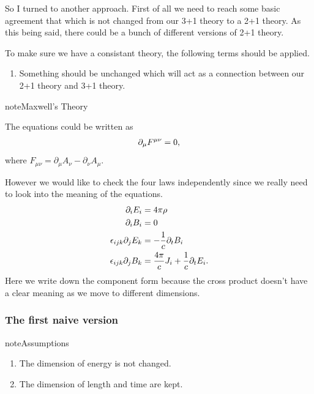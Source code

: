 \documentclass[letterpaper,10pt,english]{sphinxmanual}
\begin{document}
So I turned to another approach. First of all we need to reach some basic agreement that which is not changed from our 3+1 theory to a 2+1 theory. As this being said, there could be a bunch of different versions of 2+1 theory.

To make sure we have a consistant theory, the following terms should be applied.
\begin{enumerate}
\item {} 
Something should be unchanged which will act as a connection between our 2+1 theory and 3+1 theory.

\end{enumerate}

\begin{notice}{note}{Maxwell's Theory}

The equations could be written as
\begin{gather}
\begin{split}\partial_\mu F^{\mu\nu} = 0,\end{split}\notag
\end{gather}
where \(F_{\mu\nu} = \partial_\mu A_\nu -\partial_\nu A_\mu\).

However we would like to check the four laws independently since we really need to look into the meaning of the equations.
\begin{gather}
\begin{split}\partial_i E_i & = 4\pi \rho\\
\partial_i B_i & = 0 \\
\epsilon_{ijk} \partial_j E_k  &= -\frac{1}{c} \partial_t B_i \\
\epsilon_{ijk} \partial_j B_k & = \frac{4\pi}{c} J_i + \frac{1}{c} \partial_t E_i .\end{split}\notag
\end{gather}
Here we write down the component form because the cross product doesn't have a clear meaning as we move to different dimensions.
\end{notice}


\subsubsection{The first naive version}
\label{fun:the-first-naive-version}
\begin{notice}{note}{Assumptions}
\begin{enumerate}
\item {} 
The dimension of energy is not changed.

\item {} 
The dimension of length and time are kept.

\end{enumerate}
\end{notice}
\end{document}
